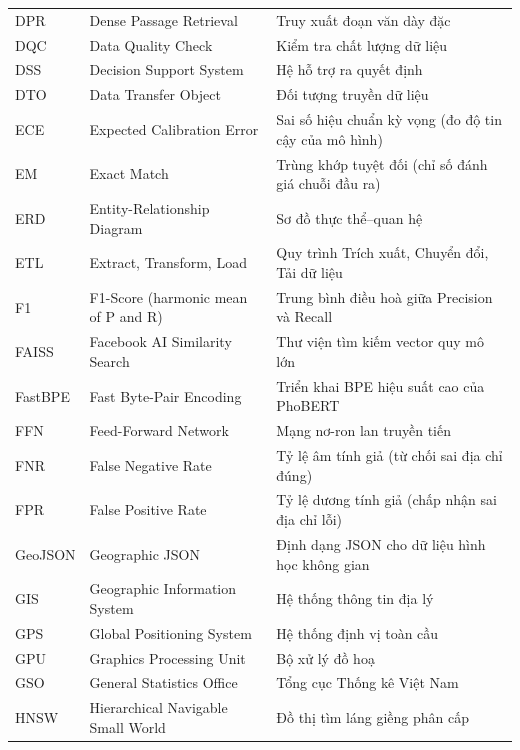 \begin{longtable}{p{2.4cm} p{5.4cm} p{6.6cm}}
DPR         & Dense Passage Retrieval                & Truy xuất đoạn văn dày đặc \\
DQC         & Data Quality Check                     & Kiểm tra chất lượng dữ liệu \\
DSS         & Decision Support System                & Hệ hỗ trợ ra quyết định \\
DTO         & Data Transfer Object                   & Đối tượng truyền dữ liệu \\
ECE         & Expected Calibration Error             & Sai số hiệu chuẩn kỳ vọng (đo độ tin cậy của mô hình) \\
EM          & Exact Match                            & Trùng khớp tuyệt đối (chỉ số đánh giá chuỗi đầu ra) \\
ERD         & Entity-Relationship Diagram            & Sơ đồ thực thể--quan hệ \\
ETL         & Extract, Transform, Load               & Quy trình Trích xuất, Chuyển đổi, Tải dữ liệu \\
F1          & F1-Score (harmonic mean of P and R)    & Trung bình điều hoà giữa Precision và Recall \\
FAISS       & Facebook AI Similarity Search          & Thư viện tìm kiếm vector quy mô lớn \\
FastBPE     & Fast Byte-Pair Encoding                & Triển khai BPE hiệu suất cao của PhoBERT \\
FFN         & Feed-Forward Network                   & Mạng nơ-ron lan truyền tiến \\
FNR         & False Negative Rate                    & Tỷ lệ âm tính giả (từ chối sai địa chỉ đúng) \\
FPR         & False Positive Rate                    & Tỷ lệ dương tính giả (chấp nhận sai địa chỉ lỗi) \\
GeoJSON     & Geographic JSON                        & Định dạng JSON cho dữ liệu hình học không gian \\
GIS         & Geographic Information System          & Hệ thống thông tin địa lý \\
GPS         & Global Positioning System              & Hệ thống định vị toàn cầu \\
GPU         & Graphics Processing Unit               & Bộ xử lý đồ hoạ \\
GSO         & General Statistics Office              & Tổng cục Thống kê Việt Nam \\
HNSW        & Hierarchical Navigable Small World     & Đồ thị tìm láng giềng phân cấp \\

\end{longtable}

